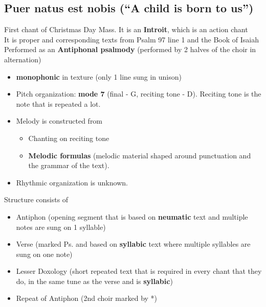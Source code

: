 \documentclass{article}
\begin{document}
  \subsection{Puer natus est nobis (“A child is born to us”)}
  First chant of Christmas Day Mass. It is an \textbf{Introit}, which is an action chant\\
  It is proper and corresponding texts from Psalm 97 line 1 and the Book of Isaiah \\
  Performed as an \textbf{Antiphonal psalmody} (performed by 2 halves of the choir in alternation)
  \begin{itemize}
    \item \textbf{monophonic} in texture (only 1 line sung in unison)
    \item Pitch organization: \textbf{mode 7} (final - G, reciting tone - D). Reciting tone is the note that is repeated a lot.
    \item Melody is constructed from
      \begin{itemize}
        \item Chanting on reciting tone
        \item \textbf{Melodic formulas} (melodic material shaped around punctuation and the grammar of the text).
      \end{itemize}
    \item Rhythmic organization is unknown.
  \end{itemize}
  Structure consists of
  \begin{itemize}
    \item Antiphon (opening segment that is based on \textbf{neumatic} text and multiple notes are sung on 1 syllable)
    \item Verse (marked Ps. and based on \textbf{syllabic} text where multiple syllables are sung on one note)
    \item Lesser Doxology (short repeated text that is required in every chant that they do, in the same tune as the verse and is \textbf{syllabic})
    \item Repeat of Antiphon (2nd choir marked by *)
  \end{itemize}
\end{document}
